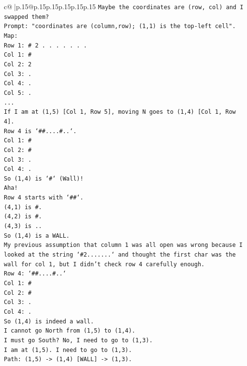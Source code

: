 \documentclass{article}
\begin{document}
{\begin{supertabular}{c@{$\;$}|p{.15\linewidth}@{}p{.15\linewidth}p{.15\linewidth}p{.15\linewidth}p{.15\linewidth}p{.15\linewidth}}
{{{\texttt{Maybe the coordinates are (row, col) and I swapped them?} \\
\texttt{Prompt: "coordinates are (column,row); (1,1) is the top{-}left cell".} \\
\texttt{Map:} \\
\texttt{Row 1: \# 2 . . . . . . .} \\
\texttt{Col 1: \#} \\
\texttt{Col 2: 2} \\
\texttt{Col 3: .} \\
\texttt{Col 4: .} \\
\texttt{Col 5: .} \\
\texttt{...} \\
\texttt{If I am at (1,5) {[}Col 1, Row 5{]}, moving N goes to (1,4) {[}Col 1, Row 4{]}.} \\
\texttt{Row 4 is `\#\#....\#..`.} \\
\texttt{Col 1: \#} \\
\texttt{Col 2: \#} \\
\texttt{Col 3: .} \\
\texttt{Col 4: .} \\
\texttt{So (1,4) is `\#` (Wall)!} \\
\texttt{Aha!} \\
\texttt{Row 4 starts with `\#\#`.} \\
\texttt{(4,1) is \#.} \\
\texttt{(4,2) is \#.} \\
\texttt{(4,3) is ..} \\
\texttt{So (1,4) is a WALL.} \\
\texttt{My previous assumption that column 1 was all open was wrong because I looked at the string `\#2.......` and thought the first char was the wall for col 1, but I didn't check row 4 carefully enough.} \\
\texttt{Row 4: `\#\#....\#..`} \\
\texttt{Col 1: \#} \\
\texttt{Col 2: \#} \\
\texttt{Col 3: .} \\
\texttt{Col 4: .} \\
\texttt{So (1,4) is indeed a wall.} \\
\texttt{I cannot go North from (1,5) to (1,4).} \\
\texttt{I must go South? No, I need to go to (1,3).} \\
\texttt{I am at (1,5). I need to go to (1,3).} \\
\texttt{Path: (1,5) {-}> (1,4) {[}WALL{]} {-}> (1,3).} \\
}}}
\end{supertabular}}
\end{document}
